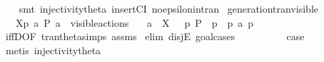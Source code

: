 \begin{isabellebody}
\ \ \isamarkupfalse%
\ {\isacharparenleft}{\kern0pt}smt\ injectivity{\isacharunderscore}{\kern0pt}theta{\isacharparenleft}{\kern0pt}{}{\isacharparenright}{\kern0pt}\ insertCI\ no{\isacharunderscore}{\kern0pt}epsilon{\isacharunderscore}{\kern0pt}in{\isacharunderscore}{\kern0pt}tran{\isacharparenleft}{\kern0pt}{}{\isacharparenright}{\kern0pt}{\isacharparenright}{\kern0pt}{\isacharplus}{\kern0pt}%
\endisatagproof
{\isafoldproof}%
%
\isadelimproof
\isanewline
%
\endisadelimproof
\isanewline
{}\isamarkupfalse%
\ generation{\isacharunderscore}{\kern0pt}tran{\isacharunderscore}{\kern0pt}visible{\isacharcolon}{\kern0pt}\isanewline
\ \ \ {\isacartoucheopen}{\isasymtheta}{\isacharbrackleft}{\kern0pt}X{\isacharbrackright}{\kern0pt}{\isacharparenleft}{\kern0pt}p{\isacharparenright}{\kern0pt}\ {\isasymlongmapsto}\isactrlsup {\isasymtheta}a\ P{\isacharprime}{\kern0pt}{\isacartoucheclose}\ {\isacartoucheopen}a\ {\isasymin}\ visible{\isacharunderscore}{\kern0pt}actions{\isacartoucheclose}\isanewline
\ \ \ {\isacartoucheopen}a\ {\isasymin}\ X\ {\isasymand}\ {\isacharparenleft}{\kern0pt}{\isasymexists}\ p{\isacharprime}{\kern0pt}{\isachardot}{\kern0pt}\ P{\isacharprime}{\kern0pt}\ {\isacharequal}{\kern0pt}\ {\isasymtheta}{\isacharparenleft}{\kern0pt}p{\isacharprime}{\kern0pt}{\isacharparenright}{\kern0pt}\ {\isasymand}\ p\ {\isasymlongmapsto}a\ p{\isacharprime}{\kern0pt}{\isacharparenright}{\kern0pt}{\isacartoucheclose}\isanewline
%
\isadelimproof
\ \ %
\endisadelimproof
%
\isatagproof
{}\isamarkupfalse%
\ iffD{}{\isacharbrackleft}{\kern0pt}OF\ tran{\isacharunderscore}{\kern0pt}theta{\isachardot}{\kern0pt}simps\ assms{\isacharparenleft}{\kern0pt}{}{\isacharparenright}{\kern0pt}{\isacharbrackright}{\kern0pt}\isanewline
{}\isamarkupfalse%
\ {\isacharparenleft}{\kern0pt}elim\ disjE{\isacharcomma}{\kern0pt}\ goal{\isacharunderscore}{\kern0pt}cases{\isacharparenright}{\kern0pt}\isanewline
\ \ \isamarkupfalse%
\ {}\isanewline
\ \ \isamarkupfalse%
\ \isamarkupfalse%
\ {\isacharquery}{\kern0pt}case\ \isamarkupfalse%
\ {\isacharparenleft}{\kern0pt}metis\ injectivity{\isacharunderscore}{\kern0pt}theta{\isacharparenleft}{\kern0pt}{}{\isacharparenright}{\kern0pt}{\isacharparenright}{\kern0pt}\isanewline
{}\isamarkupfalse%
\isanewline
\ \ \isamarkupfalse%
\ {}\isanewline
\ \ \isamarkupfalse%

\end{isabellebody}
